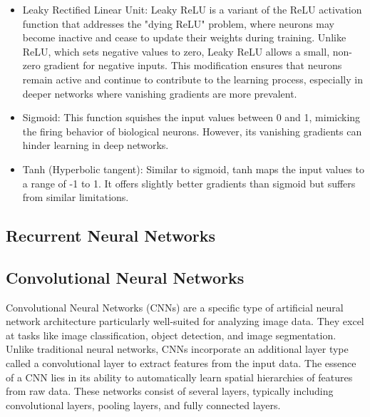 \documentclass{article}
\begin{document}
\begin{itemize}
    \item[\ding{118}] Leaky Rectified Linear Unit:
          Leaky ReLU is a variant of the ReLU activation function that addresses the "dying ReLU" problem, where neurons may become inactive and cease to update their weights during training. Unlike ReLU, which sets negative values to zero, Leaky ReLU allows a small, non-zero gradient for negative inputs. This modification ensures that neurons remain active and continue to contribute to the learning process, especially in deeper networks where vanishing gradients are more prevalent.
\end{itemize}

\begin{itemize}
    \item[\ding{118}] Sigmoid:
          This function squishes the input values between 0 and 1, mimicking the firing behavior of biological neurons. However, its vanishing gradients can hinder learning in deep networks.
\end{itemize}

\begin{itemize}
    \item[\ding{118}] Tanh (Hyperbolic tangent):
          Similar to sigmoid, tanh maps the input values to a range of -1 to 1. It offers slightly better gradients than sigmoid but suffers from similar limitations.
\end{itemize}

\subsection{Recurrent Neural Networks}


\subsection{Convolutional Neural Networks}
Convolutional Neural Networks (CNNs) are a specific type of artificial neural network architecture particularly well-suited for analyzing image data. They excel at tasks like image classification, object detection, and image segmentation. Unlike traditional neural networks, CNNs incorporate an additional layer type called a convolutional layer to extract features from the input data. The essence of a CNN lies in its ability to automatically learn spatial hierarchies of features from raw data. These networks consist of several layers, typically including convolutional layers, pooling layers, and fully connected layers.
\end{document}
